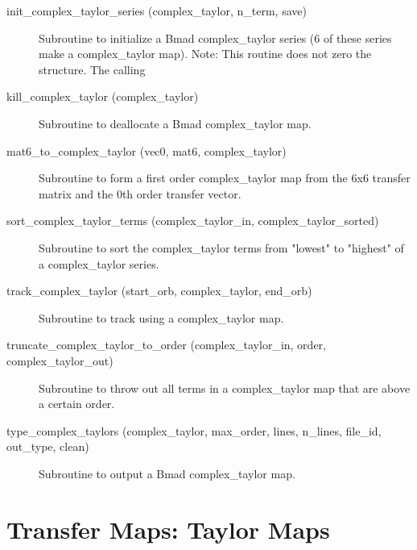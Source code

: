 \begin{description}
\label{r:init.complex.taylor.series}
\item[init_complex_taylor_series (complex_taylor, n_term, save)] \Newline 
Subroutine to initialize a Bmad complex_taylor series (6 of these series make
a complex_taylor map). Note: This routine does not zero the structure. The calling

\label{r:kill.complex.taylor}
\item[kill_complex_taylor (complex_taylor)] \Newline 
Subroutine to deallocate a Bmad complex_taylor map.

\label{r:mat6.to.complex.taylor}
\item[mat6_to_complex_taylor (vec0, mat6, complex_taylor)] \Newline 
Subroutine to form a first order complex_taylor map from the 6x6 transfer
matrix and the 0th order transfer vector.

\label{r:sort.complex.taylor.terms}
\item[sort_complex_taylor_terms (complex_taylor_in, complex_taylor_sorted)] \Newline 
Subroutine to sort the complex_taylor terms from "lowest" to "highest" of
a complex_taylor series.

\label{r:track.complex.taylor}
\item[track_complex_taylor (start_orb, complex_taylor, end_orb)] \Newline 
Subroutine to track using a complex_taylor map.

\label{r:truncate.complex.taylor.to.order}
\item[truncate_complex_taylor_to_order (complex_taylor_in, order, complex_taylor_out)] \Newline 
Subroutine to throw out all terms in a complex_taylor map that are above a certain order.

\label{r:type.complex.taylors}
\item[type_complex_taylors (complex_taylor, max_order, lines, n_lines, file_id, out_type, clean)] \Newline 
Subroutine to output a Bmad complex_taylor map.

\end{description}

\section{Transfer Maps: Taylor Maps}
\label{r:taylor}   

